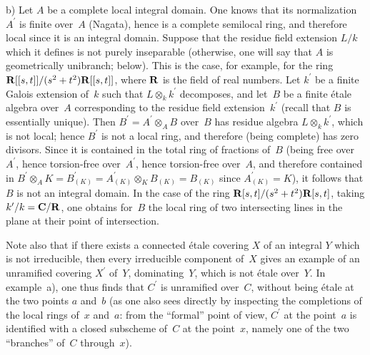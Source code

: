 b) Let $A$ be a complete local integral domain. One
knows that its normalization $A^\prime$ is finite
over~$A$ (Nagata), hence is a complete semilocal ring,
and therefore local since it is an integral domain.
Suppose that the residue field extension $L/k$ which
it defines is not purely inseparable (otherwise,
one will say that $A$ is geometrically unibranch;
\cf below). This is the case, for example, for the
ring $\mathbf{R}[[s,t]]/(s^2+t^2)\mathbf{R}[[s,t]]$, where $\mathbf{R}$
is the field of real numbers. Let $k^\prime$ be a
finite Galois extension of~$k$ such that
$L\otimes_k k^\prime$ decomposes, and let~$B$ be
a finite \'etale algebra over~$A$ corresponding
to the residue field extension~$k^\prime$ (recall
that $B$ is essentially unique). Then
$B^\prime=A^\prime\otimes_A B$ over~$B$ has residue
algebra $L\otimes_k k^\prime$, which is not local;
hence $B^\prime$ is not a local ring, and therefore
(being complete) has zero divisors. Since it is
contained in the total ring of fractions of~$B$
(being free over~$A^\prime$, hence torsion-free
over~$A^\prime$, hence torsion-free over~$A$, and
therefore contained in
$B^\prime\otimes_A K=B^\prime_{(K)}
=A^\prime_{(K)}\otimes_K B_{(K)}=B_{(K)}$
since $A^\prime_{(K)}=K$), it follows that $B$ is
not an integral domain. In the case of the ring
$\mathbf{R}[s,t]/(s^2+t^2)\mathbf{R}[s,t]$, taking
$k^\prime/k=\mathbf{C}/\mathbf{R}$, one obtains for~$B$ the local
ring of two intersecting lines in the plane at
their point of intersection.

Note also that if there exists a connected \'etale
covering $X$ of an integral $Y$ which is not
irreducible, then every irreducible component of~$X$
gives an example of an unramified covering $X^\prime$
of~$Y$, dominating~$Y$, which is not \'etale over~$Y$.
In example~a), one thus finds that $C^\prime$ is
unramified over~$C$, without being \'etale at the
two points $a$ and~$b$ (as one also sees directly
by inspecting the completions of the local rings
of~$x$ and~$a$: from the ``formal'' point of view,
$C^\prime$ at the point~$a$ is identified with
a closed subscheme of~$C$ at the point~$x$, namely
one of the two ``branches'' of~$C$ through~$x$).

